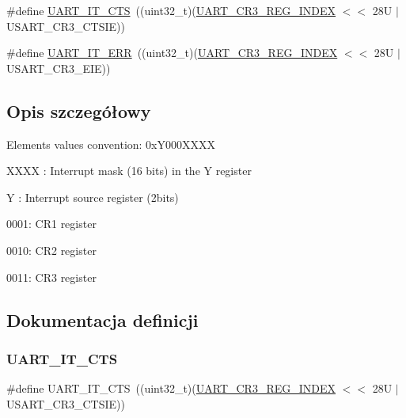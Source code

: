 \begin{DoxyCompactItemize}
\item 
\#define \hyperlink{group___u_a_r_t___interrupt__definition_ga986d271478550f9afa918262ca642333}{U\+A\+R\+T\+\_\+\+I\+T\+\_\+\+C\+TS}~((uint32\+\_\+t)(\hyperlink{group___u_a_r_t___private___constants_gac9cb22110b40ab2261468436e3038524}{U\+A\+R\+T\+\_\+\+C\+R3\+\_\+\+R\+E\+G\+\_\+\+I\+N\+D\+EX} $<$$<$ 28\+U $\vert$ U\+S\+A\+R\+T\+\_\+\+C\+R3\+\_\+\+C\+T\+S\+I\+E))
\item 
\#define \hyperlink{group___u_a_r_t___interrupt__definition_ga8eb26d8edd9bf78ae8d3ad87dd51b618}{U\+A\+R\+T\+\_\+\+I\+T\+\_\+\+E\+RR}~((uint32\+\_\+t)(\hyperlink{group___u_a_r_t___private___constants_gac9cb22110b40ab2261468436e3038524}{U\+A\+R\+T\+\_\+\+C\+R3\+\_\+\+R\+E\+G\+\_\+\+I\+N\+D\+EX} $<$$<$ 28\+U $\vert$ U\+S\+A\+R\+T\+\_\+\+C\+R3\+\_\+\+E\+I\+E))
\end{DoxyCompactItemize}


\subsection{Opis szczegółowy}
Elements values convention\+: 0x\+Y000\+X\+X\+XX
\begin{DoxyItemize}
\item X\+X\+XX \+: Interrupt mask (16 bits) in the Y register
\item Y \+: Interrupt source register (2bits)
\begin{DoxyItemize}
\item 0001\+: C\+R1 register
\item 0010\+: C\+R2 register
\item 0011\+: C\+R3 register 
\end{DoxyItemize}
\end{DoxyItemize}

\subsection{Dokumentacja definicji}
\mbox{\label{group___u_a_r_t___interrupt__definition_ga986d271478550f9afa918262ca642333}} 
\subsubsection{\texorpdfstring{U\+A\+R\+T\+\_\+\+I\+T\+\_\+\+C\+TS}{UART\_IT\_CTS}}
{\footnotesize\ttfamily \#define U\+A\+R\+T\+\_\+\+I\+T\+\_\+\+C\+TS~((uint32\+\_\+t)(\hyperlink{group___u_a_r_t___private___constants_gac9cb22110b40ab2261468436e3038524}{U\+A\+R\+T\+\_\+\+C\+R3\+\_\+\+R\+E\+G\+\_\+\+I\+N\+D\+EX} $<$$<$ 28\+U $\vert$ U\+S\+A\+R\+T\+\_\+\+C\+R3\+\_\+\+C\+T\+S\+I\+E))}




